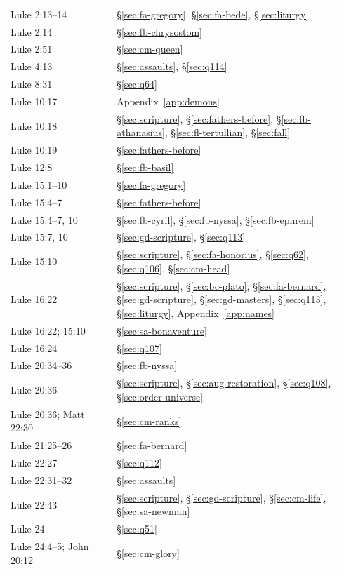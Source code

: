 \begin{longtable}{>{\raggedright\arraybackslash}p{0.30\linewidth}>{\raggedright\arraybackslash}p{0.64\linewidth}}
Luke 2:13--14 & \S\ref{sec:fa-gregory}, \S\ref{sec:fa-bede}, \S\ref{sec:liturgy}\\
Luke 2:14 & \S\ref{sec:fb-chrysostom}\\
Luke 2:51 & \S\ref{sec:cm-queen}\\
Luke 4:13 & \S\ref{sec:assaults}, \S\ref{sec:q114}\\
Luke 8:31 & \S\ref{sec:q64}\\
Luke 10:17 & Appendix~\ref{app:demons}\\
Luke 10:18 & \S\ref{sec:scripture}, \S\ref{sec:fathers-before}, \S\ref{sec:fb-athanasius}, \S\ref{sec:fl-tertullian}, \S\ref{sec:fall}\\
Luke 10:19 & \S\ref{sec:fathers-before}\\
Luke 12:8 & \S\ref{sec:fb-basil}\\
Luke 15:1--10 & \S\ref{sec:fa-gregory}\\
Luke 15:4--7 & \S\ref{sec:fathers-before}\\
Luke 15:4--7, 10 & \S\ref{sec:fb-cyril}, \S\ref{sec:fb-nyssa}, \S\ref{sec:fb-ephrem}\\
Luke 15:7, 10 & \S\ref{sec:gd-scripture}, \S\ref{sec:q113}\\
Luke 15:10 & \S\ref{sec:scripture}, \S\ref{sec:fa-honorius}, \S\ref{sec:q62}, \S\ref{sec:q106}, \S\ref{sec:cm-head}\\
Luke 16:22 & \S\ref{sec:scripture}, \S\ref{sec:bc-plato}, \S\ref{sec:fa-bernard}, \S\ref{sec:gd-scripture}, \S\ref{sec:gd-masters}, \S\ref{sec:q113}, \S\ref{sec:liturgy}, Appendix~\ref{app:names}\\
Luke 16:22; 15:10 & \S\ref{sec:sa-bonaventure}\\
Luke 16:24 & \S\ref{sec:q107}\\
Luke 20:34--36 & \S\ref{sec:fb-nyssa}\\
Luke 20:36 & \S\ref{sec:scripture}, \S\ref{sec:aug-restoration}, \S\ref{sec:q108}, \S\ref{sec:order-universe}\\
Luke 20:36; Matt 22:30 & \S\ref{sec:cm-ranks}\\
Luke 21:25--26 & \S\ref{sec:fa-bernard}\\
Luke 22:27 & \S\ref{sec:q112}\\
Luke 22:31--32 & \S\ref{sec:assaults}\\
Luke 22:43 & \S\ref{sec:scripture}, \S\ref{sec:gd-scripture}, \S\ref{sec:cm-life}, \S\ref{sec:sa-newman}\\
Luke 24 & \S\ref{sec:q51}\\
Luke 24:4--5; John 20:12 & \S\ref{sec:cm-glory}\\

\end{longtable}
